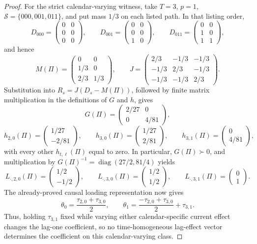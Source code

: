 \documentclass{article}
\begin{document}
\begin{proof}
For the strict calendar-varying witness, take \(T=3\), \(p=1\), \(\mathcal S=\{000,001,011\}\), and put mass \(1/3\) on each listed path.  In that listing order,
\[
 D_{000}=\begin{pmatrix}0&0\\0&0\\0&0\end{pmatrix},\qquad
 D_{001}=\begin{pmatrix}0&0\\0&0\\1&0\end{pmatrix},\qquad
 D_{011}=\begin{pmatrix}0&0\\1&0\\1&1\end{pmatrix},
\]
and hence
\[
 M(\Pi)=\begin{pmatrix}0&0\\1/3&0\\2/3&1/3\end{pmatrix},\qquad
 J=\begin{pmatrix}2/3&-1/3&-1/3\\-1/3&2/3&-1/3\\-1/3&-1/3&2/3\end{pmatrix}.
\]
Substitution into \(R_s=J(D_s-M(\Pi))\), followed by finite matrix multiplication in the definitions of \(G\) and \(h\), gives
\[
 G(\Pi)=\begin{pmatrix}2/27&0\\0&4/81\end{pmatrix},
\]
\[
 h_{2,0}(\Pi)=\begin{pmatrix}1/27\\-2/81\end{pmatrix},\qquad
 h_{3,0}(\Pi)=\begin{pmatrix}1/27\\2/81\end{pmatrix},\qquad
 h_{3,1}(\Pi)=\begin{pmatrix}0\\4/81\end{pmatrix},
\]
with every other \(h_{t,\ell}(\Pi)\) equal to zero.  In particular, \(G(\Pi)\succ0\), and multiplication by
\(G(\Pi)^{-1}=\operatorname{diag}(27/2,81/4)\) yields
\[
 L_{\cdot,2,0}(\Pi)=\begin{pmatrix}1/2\\-1/2\end{pmatrix},\qquad
 L_{\cdot,3,0}(\Pi)=\begin{pmatrix}1/2\\1/2\end{pmatrix},\qquad
 L_{\cdot,3,1}(\Pi)=\begin{pmatrix}0\\1\end{pmatrix}.
\]
The already-proved causal loading representation now gives
\[
 \theta_0=\frac{\tau_{2,0}+\tau_{3,0}}{2},\qquad
 \theta_1=\frac{-\tau_{2,0}+\tau_{3,0}}{2}+\tau_{3,1}.
\]
Thus, holding \(\tau_{3,1}\) fixed while varying either calendar-specific current effect changes the lag-one coefficient, so no time-homogeneous lag-effect vector determines the coefficient on this calendar-varying class.


\end{proof}
\end{document}
